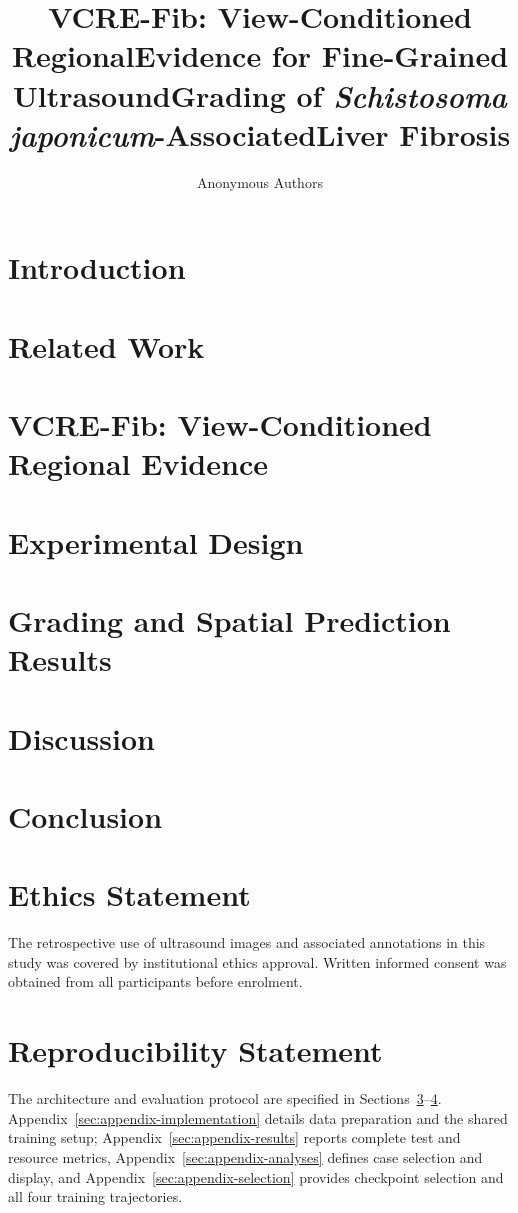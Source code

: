 \documentclass{article}
\title{VCRE-Fib: View-Conditioned Regional\newline Evidence for Fine-Grained Ultrasound\newline Grading of \textnormal{\emph{Schistosoma japonicum}}-Associated\newline Liver Fibrosis}
\author{Anonymous Authors}
\begin{document}
\maketitle
\begin{abstract}

\end{abstract}
\section{Introduction}\label{sec:introduction}


\section{Related Work}\label{sec:related}

\section{VCRE-Fib: View-Conditioned Regional Evidence}\label{sec:method}

\section{Experimental Design}\label{sec:setup}

\section{Grading and Spatial Prediction Results}\label{sec:results}

\section{Discussion}\label{sec:discussion}

\section{Conclusion}\label{sec:conclusion}

\label{main-text-end}
\clearpage
\section*{Ethics Statement}\label{post-main-start}
The retrospective use of ultrasound images and associated annotations in this study was covered by institutional ethics approval. Written informed consent was obtained from all participants before enrolment.
\section*{Reproducibility Statement}
The architecture and evaluation protocol are specified in Sections~\ref{sec:method}--\ref{sec:setup}. Appendix~\ref{sec:appendix-implementation} details data preparation and the shared training setup; Appendix~\ref{sec:appendix-results} reports complete test and resource metrics, Appendix~\ref{sec:appendix-analyses} defines case selection and display, and Appendix~\ref{sec:appendix-selection} provides checkpoint selection and all four training trajectories.
\end{document}
